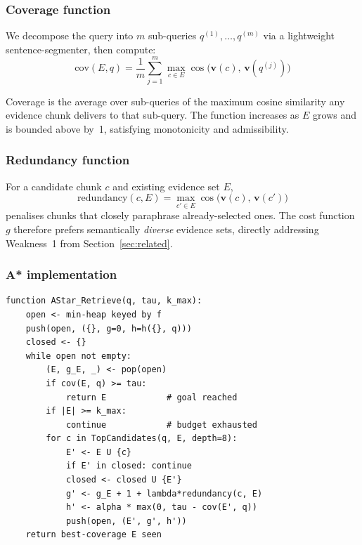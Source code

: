 \documentclass[conference]{IEEEtran}
\begin{document}
\subsubsection{Coverage function}
\label{sec:coverage}

We decompose the query into $m$ sub-queries
$q^{(1)}, \ldots, q^{(m)}$ via a lightweight sentence-segmenter, then compute:
\begin{equation}
  \mathrm{cov}(E, q)
  = \frac{1}{m} \sum_{j=1}^{m}
    \max_{c \in E}
    \cos\!\bigl(\mathbf{v}(c),\,\mathbf{v}(q^{(j)})\bigr)
  \label{eq:cov}
\end{equation}

Coverage is the average over sub-queries of the maximum cosine similarity any
evidence chunk delivers to that sub-query. The function increases as $E$ grows
and is bounded above by~1, satisfying monotonicity and admissibility.

\subsubsection{Redundancy function}

For a candidate chunk $c$ and existing evidence set $E$,
\begin{equation}
  \mathrm{redundancy}(c, E)
  = \max_{c' \in E} \cos\!\bigl(\mathbf{v}(c),\,\mathbf{v}(c')\bigr)
  \label{eq:red}
\end{equation}
penalises chunks that closely paraphrase already-selected ones. The cost
function $g$ therefore prefers semantically \textit{diverse} evidence sets,
directly addressing Weakness~1 from Section~\ref{sec:related}.

\subsubsection{A* implementation}

\begin{lstlisting}[caption={A* retrieval pseudocode.},label={alg:astar}]
function AStar_Retrieve(q, tau, k_max):
    open <- min-heap keyed by f
    push(open, ({}, g=0, h=h({}, q)))
    closed <- {}
    while open not empty:
        (E, g_E, _) <- pop(open)
        if cov(E, q) >= tau:
            return E            # goal reached
        if |E| >= k_max:
            continue            # budget exhausted
        for c in TopCandidates(q, E, depth=8):
            E' <- E U {c}
            if E' in closed: continue
            closed <- closed U {E'}
            g' <- g_E + 1 + lambda*redundancy(c, E)
            h' <- alpha * max(0, tau - cov(E', q))
            push(open, (E', g', h'))
    return best-coverage E seen
\end{lstlisting}
\end{document}
